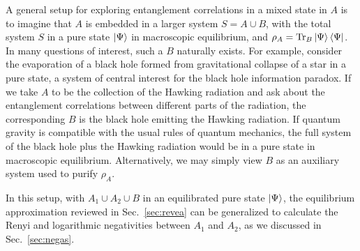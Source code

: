 \documentclass[a4paper,11pt]{article}
\newcommand*{\JKF}[1]{\textcolor{blue}{#1}}
\begin{document}
A general setup for exploring entanglement correlations in a mixed state in $A$ is to imagine that $A$ is embedded in a larger 
system $S = A\cup B$, with the total system $S$ in a pure state $\ket{\Psi}$ in macroscopic equilibrium,
and $\rho_A = {\rm Tr}_B \ket{\Psi} \bra{\Psi}$. 
In many questions of interest, such a $B$ naturally exists. For example, consider the evaporation of a black hole formed from gravitational collapse of a star in a pure state, a system of central interest for the black hole information paradox. If we take $A$ to be the collection of the Hawking radiation and ask about the entanglement correlations between different parts of the radiation, the corresponding $B$ is the black hole emitting the Hawking radiation. If quantum gravity is compatible with the usual rules of quantum mechanics, the full system of the black hole plus the Hawking radiation would be in a pure state in macroscopic equilibrium. 
Alternatively, we may simply view $B$ as an auxiliary system used to purify $\rho_A$. 

In this setup, with $A_1 \cup A_2 \cup B$ in an equilibrated pure state $\ket{\Psi}$, 
the equilibrium approximation reviewed in Sec.~\ref{sec:revea} can be generalized to calculate the Renyi and logarithmic negativities between $A_1$ and $A_2$, as we discussed in Sec.~\ref{sec:negas}. 
\end{document}
